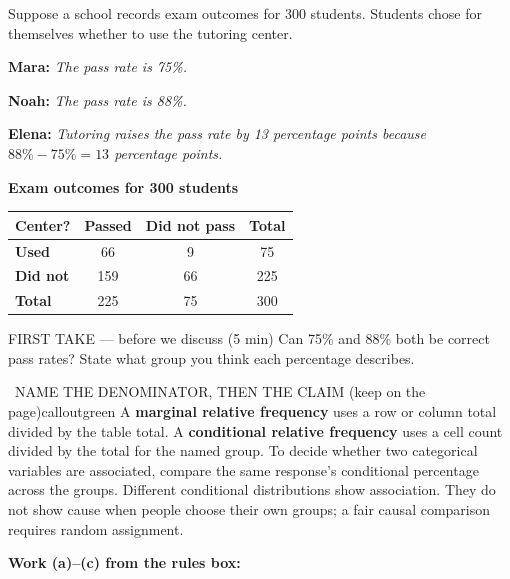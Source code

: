 \documentclass[11pt]{article}
\begin{document}


Suppose a school records exam outcomes for 300 students. Students chose for themselves whether to use the tutoring center.\par\smallskip \textbf{Mara:} \emph{The pass rate is 75\%.}\par \textbf{Noah:} \emph{The pass rate is 88\%.}\par \textbf{Elena:} \emph{Tutoring raises the pass rate by 13 percentage points because $88\%-75\%=13$ percentage points.}\par
\begin{center}
\textbf{Exam outcomes for 300 students}\par\smallskip
\begin{tabular}{|l|c|c|c|}
\hline
\textbf{Center?} & \textbf{Passed} & \textbf{Did not pass} & \textbf{Total} \\ \hline
\textbf{Used} & 66 & 9 & 75 \\ \hline
\textbf{Did not} & 159 & 66 & 225 \\ \hline
\textbf{Total} & 225 & 75 & 300 \\ \hline
\end{tabular}
\end{center}
\begin{firsttakebox}{FIRST TAKE --- before we discuss (5 min)}
Can 75\% and 88\% both be correct pass rates? State what group you think each percentage describes.
\workspace{0.9in}
\end{firsttakebox}

\begin{callout}{\IconBook\ NAME THE DENOMINATOR, THEN THE CLAIM (keep on the page)}{calloutgreen}
A \textbf{marginal relative frequency} uses a row or column total divided by the table total. A
\textbf{conditional relative frequency} uses a cell count divided by the total for the named group.
To decide whether two categorical variables are associated, compare the same response's conditional
percentage across the groups. Different conditional distributions show association. They do not show cause
when people choose their own groups; a fair causal comparison requires random assignment.
\end{callout}

\newpage
\textbf{Work (a)--(c) from the rules box:}\par\smallskip
\end{document}
